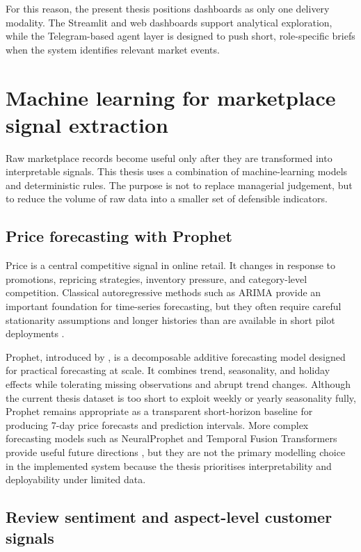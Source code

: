 For this reason, the present thesis positions dashboards as only one
delivery modality. The Streamlit and web dashboards support analytical
exploration, while the Telegram-based agent layer is designed to push
short, role-specific briefs when the system identifies relevant market
events.

\section{Machine learning for marketplace signal extraction}

Raw marketplace records become useful only after they are transformed
into interpretable signals. This thesis uses a combination of
machine-learning models and deterministic rules. The purpose is not to
replace managerial judgement, but to reduce the volume of raw data into a
smaller set of defensible indicators.

\subsection{Price forecasting with Prophet}

Price is a central competitive signal in online retail. It changes in
response to promotions, repricing strategies, inventory pressure, and
category-level competition. Classical autoregressive methods such as
ARIMA provide an important foundation for time-series forecasting, but
they often require careful stationarity assumptions and longer histories
than are available in short pilot deployments \citep{box2015time}.

Prophet, introduced by \citet{taylor2018forecasting}, is a decomposable
additive forecasting model designed for practical forecasting at scale.
It combines trend, seasonality, and holiday effects while tolerating
missing observations and abrupt trend changes. Although the current
thesis dataset is too short to exploit weekly or yearly seasonality
fully, Prophet remains appropriate as a transparent short-horizon
baseline for producing 7-day price forecasts and prediction intervals.
More complex forecasting models such as NeuralProphet and Temporal
Fusion Transformers provide useful future directions
\citep{triebe2021neuralprophet, lim2021temporal}, but they are not the
primary modelling choice in the implemented system because the thesis
prioritises interpretability and deployability under limited data.

\subsection{Review sentiment and aspect-level customer signals}

